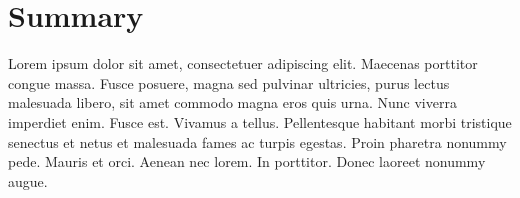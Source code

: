 \chapter*{Summary}
Lorem ipsum dolor sit amet, consectetuer adipiscing elit. Maecenas porttitor congue massa. Fusce posuere, magna sed pulvinar ultricies, purus lectus malesuada libero, sit amet commodo magna eros quis urna.
Nunc viverra imperdiet enim. Fusce est. Vivamus a tellus.
Pellentesque habitant morbi tristique senectus et netus et malesuada fames ac turpis egestas. Proin pharetra nonummy pede. Mauris et orci.
Aenean nec lorem. In porttitor. Donec laoreet nonummy augue.

